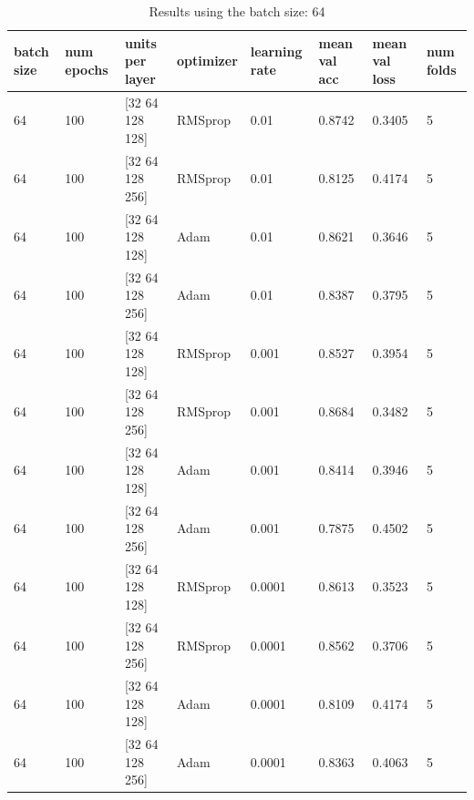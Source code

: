 \documentclass{book}
\begin{document}
            \begin{table}
                \begin{center}
                    \begin{tabular}{m{1cm}m{1cm}m{2.5cm}m{1.3cm}m{1cm}m{2cm}m{2cm}m{1cm}}
                        \midrule
                        batch size	& num epochs	& units per layer	& optimizer	& learning rate	& mean val acc	& mean val loss	& num folds \\
                        \midrule
                        64	& 100	& [32  64  128  128]	& RMSprop	& 0.01	& 0.8742 & 0.3405 & 5 \\
                        \midrule
                        64	& 100	& [32  64  128  256]	& RMSprop	& 0.01	& 0.8125 & 0.4174 & 5 \\
                        \midrule
                        64	& 100	& [32  64  128  128]	& Adam	& 0.01	& 0.8621 & 0.3646 & 5 \\
                        \midrule
                        64	& 100	& [32  64  128  256]	& Adam	& 0.01	& 0.8387 & 0.3795 & 5 \\
                        \midrule
                        64	& 100	& [32  64  128  128]	& RMSprop	& 0.001	& 0.8527 & 0.3954 & 5 \\
                        \midrule
                        64	& 100	& [32  64  128  256]	& RMSprop	& 0.001	& 0.8684 & 0.3482 & 5 \\
                        \midrule
                        64	& 100	& [32  64  128  128]	& Adam	& 0.001	& 0.8414 & 0.3946 & 5 \\
                        \midrule
                        64	& 100	& [32  64  128  256]	& Adam	& 0.001	& 0.7875 & 0.4502 & 5 \\
                        \midrule
                        64	& 100	& [32  64  128  128]	& RMSprop	& 0.0001	& 0.8613 & 0.3523 & 5 \\
                        \midrule
                        64	& 100	& [32  64  128  256]	& RMSprop	& 0.0001	& 0.8562 & 0.3706 & 5 \\
                        \midrule
                        64	& 100	& [32  64  128  128]	& Adam	& 0.0001	& 0.8109 & 0.4174 & 5 \\
                        \midrule
                        64	& 100	& [32  64  128  256]	& Adam	& 0.0001	& 0.8363 & 0.4063 & 5 \\
                        \midrule
                    \end{tabular}
                \end{center}
                \caption{\label{tab:results}Results using the batch size: 64}
            \end{table}
\end{document}

